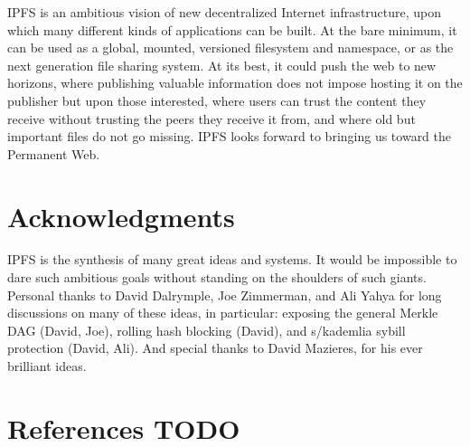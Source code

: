\documentclass{sig-alternate}
\begin{document}
IPFS is an ambitious vision of new decentralized Internet infrastructure, upon which many different kinds of applications can be built. At the bare minimum, it can be used as a global, mounted, versioned filesystem and namespace, or as the next generation file sharing system. At its best, it could push the web to new horizons, where publishing valuable information does not impose hosting it on the publisher but upon those interested, where users can trust the content they receive without trusting the peers they receive it from, and where old but important files do not go missing. IPFS looks forward to bringing us toward the Permanent Web.


\section{Acknowledgments}

IPFS is the synthesis of many great ideas and systems. It would be impossible to dare such ambitious goals without standing on the shoulders of such giants. Personal thanks to David Dalrymple, Joe Zimmerman, and Ali Yahya for long discussions on many of these ideas, in particular: exposing the general Merkle DAG (David, Joe), rolling hash blocking (David), and s/kademlia sybill protection (David, Ali). And special thanks to David Mazieres, for his ever brilliant ideas.

\section{References TODO}



\end{document}
